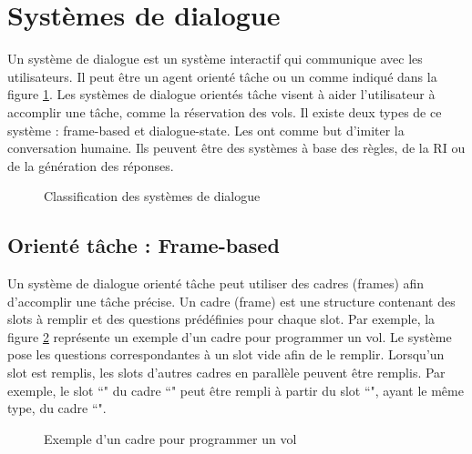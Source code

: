 \documentclass{KodeBook}
\begin{document}
\section{Systèmes de dialogue}

Un système de dialogue est un système interactif qui communique avec les utilisateurs. 
Il peut être un agent orienté tâche ou un  comme indiqué dans la figure \ref{fig:sd-classif}. 
Les systèmes de dialogue orientés tâche visent à aider l'utilisateur à accomplir une tâche, comme la réservation des vols. 
Il existe deux types de ce système : frame-based et dialogue-state. 
Les  ont comme but d'imiter la conversation humaine.
Ils peuvent être des systèmes à base des règles, de la RI ou de la génération des réponses.

\begin{figure}[!ht]
	\centering
	\caption{Classification des systèmes de dialogue}
	\label{fig:sd-classif}
\end{figure}


\subsection{Orienté tâche : Frame-based}

Un système de dialogue orienté tâche peut utiliser des cadres (frames) afin d'accomplir une tâche précise. 
Un cadre (frame) est une structure contenant des slots à remplir et des questions prédéfinies pour chaque slot.
Par exemple, la figure \ref{fig:sd-tache-frame-exp} représente un exemple d'un cadre pour programmer un vol.
Le système pose les questions correspondantes à un slot vide afin de le remplir.
Lorsqu'un slot est remplis, les slots d'autres cadres en parallèle peuvent être remplis. 
Par exemple, le slot ``" du cadre ``" peut être rempli à partir du slot ``", ayant le même type, du cadre ``".

\begin{figure}[!ht]
	\centering
	\caption[Exemple d'un cadre pour programmer un vol]{Exemple d'un cadre pour programmer un vol \cite{2020-jurafsky-martin}}
	\label{fig:sd-tache-frame-exp}
\end{figure}
\end{document}
